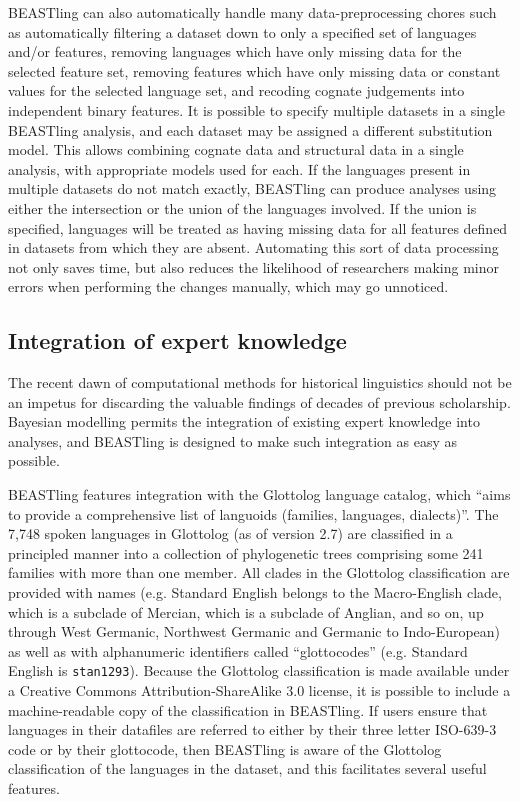\documentclass[10pt,a4paper]{article}
\begin{document}
BEASTling can also automatically handle many data-preprocessing chores such as automatically filtering a dataset down to only a specified set of languages and/or features, removing languages which have only missing data for the selected feature set, removing features which have only missing data or constant values for the selected language set, and recoding cognate judgements into independent binary features.  It is possible to specify multiple datasets in a single BEASTling analysis, and each dataset may be assigned a different substitution model.  This allows combining cognate data and structural data in a single analysis, with appropriate models used for each.  If the languages present in multiple datasets do not match exactly, BEASTling can produce analyses using either the intersection or the union of the languages involved.  If the union is specified, languages will be treated as having missing data for all features defined in datasets from which they are absent.  Automating this sort of data processing not only saves time, but also reduces the likelihood of researchers making minor errors when performing the changes manually, which may go unnoticed.

\subsection{Integration of expert knowledge}

The recent dawn of computational methods for historical linguistics should not be an impetus for discarding the valuable findings of decades of previous scholarship.  Bayesian modelling permits the integration of existing expert knowledge into analyses, and BEASTling is designed to make such integration as easy as possible.

BEASTling features integration with the Glottolog language catalog\cite{Hammarstroem2016}, which ``aims to provide a comprehensive list of languoids (families, languages, dialects)''.  The  7,748 spoken languages in Glottolog (as of version 2.7) are classified in a principled manner into a collection of phylogenetic trees comprising some 241 families with more than one member.  All clades in the Glottolog classification are provided with names (e.g. Standard English belongs to the Macro-English clade, which is a subclade of Mercian, which is a subclade of Anglian, and so on, up through West Germanic, Northwest Germanic and Germanic to Indo-European) as well as with alphanumeric identifiers called ``glottocodes'' (e.g. Standard English is \texttt{stan1293}).  Because the Glottolog classification is made available under a Creative Commons Attribution-ShareAlike 3.0 license, it is possible to include a machine-readable copy of the classification in BEASTling.  If users ensure that languages in their datafiles are referred to either by their three letter ISO-639-3 code or by their glottocode, then BEASTling is aware of the Glottolog classification of the languages in the dataset, and this facilitates several useful features.
\end{document}
